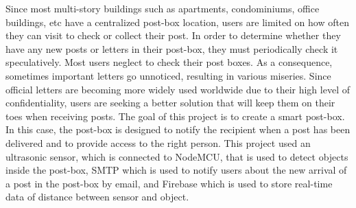 \label{Abstract}
Since most multi-story buildings such as apartments, condominiums, office buildings, etc have a centralized post-box location, users are limited on how often they can visit to check or collect their post. In order to determine whether they have any new posts or letters in their post-box, they must periodically check it speculatively. Most users neglect to check their post boxes. As a consequence, sometimes important letters go unnoticed, resulting in various miseries. Since official letters are becoming more widely used worldwide due to their high level of confidentiality, users are seeking a better solution that will keep them on their toes when receiving posts. The goal of this project is to create a smart post-box. In this case, the post-box is designed to notify the recipient when a post has been delivered and to provide access to the right person. This project used an ultrasonic sensor, which is connected to NodeMCU, that is used to detect objects inside the post-box, SMTP which is used to notify users about the new arrival of a post in the post-box by email, and Firebase which is used to store real-time data of distance between sensor and object. 